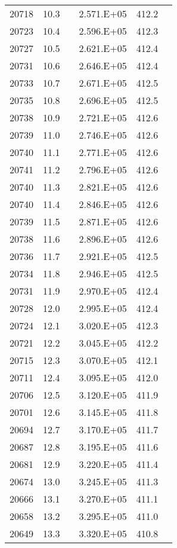 \begin{longtable}{cccccc}
  20718 & 10.3 &  & 2.571.E+05 & 412.2 &  \\
  20723 & 10.4 &  & 2.596.E+05 & 412.3 &  \\
  20727 & 10.5 &  & 2.621.E+05 & 412.4 &  \\
  20731 & 10.6 &  & 2.646.E+05 & 412.4 &  \\
  20733 & 10.7 &  & 2.671.E+05 & 412.5 &  \\
  20735 & 10.8 &  & 2.696.E+05 & 412.5 &  \\
  20738 & 10.9 &  & 2.721.E+05 & 412.6 &  \\
  20739 & 11.0 &  & 2.746.E+05 & 412.6 &  \\
  20740 & 11.1 &  & 2.771.E+05 & 412.6 &  \\
  20741 & 11.2 &  & 2.796.E+05 & 412.6 &  \\
  20740 & 11.3 &  & 2.821.E+05 & 412.6 &  \\
  20740 & 11.4 &  & 2.846.E+05 & 412.6 &  \\
  20739 & 11.5 &  & 2.871.E+05 & 412.6 &  \\
  20738 & 11.6 &  & 2.896.E+05 & 412.6 &  \\
  20736 & 11.7 &  & 2.921.E+05 & 412.5 &  \\
  20734 & 11.8 &  & 2.946.E+05 & 412.5 &  \\
  20731 & 11.9 &  & 2.970.E+05 & 412.4 &  \\
  20728 & 12.0 &  & 2.995.E+05 & 412.4 &  \\
  20724 & 12.1 &  & 3.020.E+05 & 412.3 &  \\
  20721 & 12.2 &  & 3.045.E+05 & 412.2 &  \\
  20715 & 12.3 &  & 3.070.E+05 & 412.1 &  \\
  20711 & 12.4 &  & 3.095.E+05 & 412.0 &  \\
  20706 & 12.5 &  & 3.120.E+05 & 411.9 &  \\
  20701 & 12.6 &  & 3.145.E+05 & 411.8 &  \\
  20694 & 12.7 &  & 3.170.E+05 & 411.7 &  \\
  20687 & 12.8 &  & 3.195.E+05 & 411.6 &  \\
  20681 & 12.9 &  & 3.220.E+05 & 411.4 &  \\
  20674 & 13.0 &  & 3.245.E+05 & 411.3 &  \\
  20666 & 13.1 &  & 3.270.E+05 & 411.1 &  \\
  20658 & 13.2 &  & 3.295.E+05 & 411.0 &  \\
  20649 & 13.3 &  & 3.320.E+05 & 410.8 &  \\

\end{longtable}
